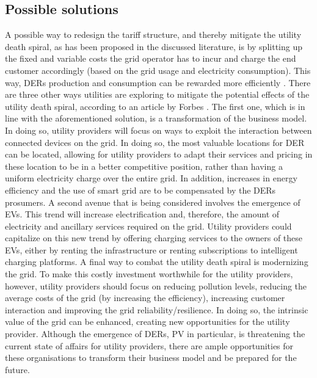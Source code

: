 \subsection{Possible solutions}
A possible way to redesign the tariff structure, and thereby mitigate the utility death spiral, as has been proposed in the discussed literature, is by splitting up the fixed and variable costs the grid operator has to incur and charge the end customer accordingly (based on the grid usage and electricity consumption). This way, DERs production and consumption can be rewarded more efficiently \cite{spiral4}. 
\newline \newline \noindent
There are three other ways utilities are exploring to mitigate the potential effects of the utility death spiral, according to an article by Forbes \cite{solutions}. The first one, which is in line with the aforementioned solution, is a transformation of the business model. In doing so, utility providers will focus on ways to exploit the interaction between connected devices on the grid. In doing so, the most valuable locations for DER can be located, allowing for utility providers to adapt their services and pricing in these location to be in a better competitive position, rather than having a uniform electricity charge over the entire grid. In addition, increases in energy efficiency and the use of smart grid are to be compensated by the DERs prosumers. A second avenue that is being considered involves the emergence of EVs. This trend will increase electrification and, therefore, the amount of electricity and ancillary services required on the grid. Utility providers could capitalize on this new trend by offering charging services to the owners of these EVs, either by renting the infrastructure or renting subscriptions to intelligent charging platforms. A final way to combat the utility death spiral is modernizing the grid. To make this costly investment worthwhile for the utility providers, however, utility providers should focus on reducing pollution levels, reducing the average costs of the grid (by increasing the efficiency), increasing customer interaction and improving the grid reliability/resilience. In doing so, the intrinsic value of the grid can be enhanced, creating new opportunities for the utility provider.
\newline \newline \noindent
Although the emergence of DERs, PV in particular, is threatening the current state of affairs for utility providers, there are ample opportunities for these organisations to transform their business model and be prepared for the future. 
